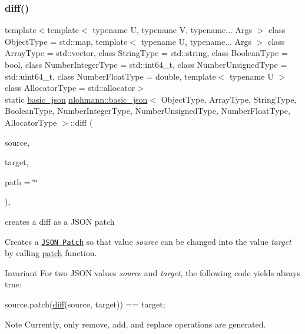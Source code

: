 \subsubsection{\texorpdfstring{diff()}{diff()}}
{\footnotesize\ttfamily template$<$template$<$ typename U, typename V, typename... Args $>$ class Object\+Type = std\+::map, template$<$ typename U, typename... Args $>$ class Array\+Type = std\+::vector, class String\+Type  = std\+::string, class Boolean\+Type  = bool, class Number\+Integer\+Type  = std\+::int64\+\_\+t, class Number\+Unsigned\+Type  = std\+::uint64\+\_\+t, class Number\+Float\+Type  = double, template$<$ typename U $>$ class Allocator\+Type = std\+::allocator$>$ \\
static \hyperlink{classnlohmann_1_1basic__json}{basic\+\_\+json} \hyperlink{classnlohmann_1_1basic__json}{nlohmann\+::basic\+\_\+json}$<$ Object\+Type, Array\+Type, String\+Type, Boolean\+Type, Number\+Integer\+Type, Number\+Unsigned\+Type, Number\+Float\+Type, Allocator\+Type $>$\+::diff (\begin{DoxyParamCaption}\item[{const \hyperlink{classnlohmann_1_1basic__json}{basic\+\_\+json}$<$ Object\+Type, Array\+Type, String\+Type, Boolean\+Type, Number\+Integer\+Type, Number\+Unsigned\+Type, Number\+Float\+Type, Allocator\+Type $>$ \&}]{source,  }\item[{const \hyperlink{classnlohmann_1_1basic__json}{basic\+\_\+json}$<$ Object\+Type, Array\+Type, String\+Type, Boolean\+Type, Number\+Integer\+Type, Number\+Unsigned\+Type, Number\+Float\+Type, Allocator\+Type $>$ \&}]{target,  }\item[{const std\+::string \&}]{path = {\ttfamily \char`\"{}\char`\"{}} }\end{DoxyParamCaption})\hspace{0.3cm}{\ttfamily [inline]}, {\ttfamily [static]}}



creates a diff as a J\+S\+ON patch 

Creates a \href{http://jsonpatch.com}{\tt J\+S\+ON Patch} so that value {\itshape source} can be changed into the value {\itshape target} by calling \hyperlink{classnlohmann_1_1basic__json_aff9d131320db407da31304fb2b5cb7a5}{patch} function.

\begin{DoxyInvariant}{Invariant}
For two J\+S\+ON values {\itshape source} and {\itshape target}, the following code yields always {\ttfamily true}\+: 
\begin{DoxyCode}
source.patch(\hyperlink{classnlohmann_1_1basic__json_a5ef1934868b90452a4a34695489c60cd}{diff}(source, target)) == target;
\end{DoxyCode}

\end{DoxyInvariant}
\begin{DoxyNote}{Note}
Currently, only {\ttfamily remove}, {\ttfamily add}, and {\ttfamily replace} operations are generated.
\end{DoxyNote}

